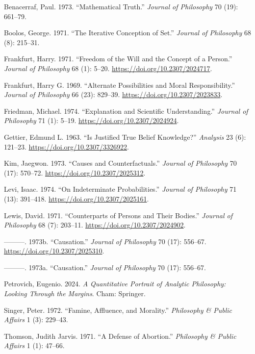 \documentclass[
  12pt,
  letterpaper,
  DIV=11,
  numbers=noendperiod]{scrartcl}
\newlength{\cslhangindent}
\newenvironment{CSLReferences}[2] %
 {\begin{list}{}{%
  \setlength{\itemindent}{0pt}
  \setlength{\leftmargin}{0pt}
  \setlength{\parsep}{0pt}
  \ifodd #1
   \setlength{\leftmargin}{\cslhangindent}
   \setlength{\itemindent}{-1\cslhangindent}
  \fi
  \setlength{\itemsep}{#2\baselineskip}}}
 {\end{list}}
\begin{document}
\label{refs}
\begin{CSLReferences}{1}{0}
Benacerraf, Paul. 1973. {``Mathematical Truth.''} \emph{Journal of
Philosophy} 70 (19): 661--79.

Boolos, George. 1971. {``The Iterative Conception of Set.''}
\emph{Journal of Philosophy} 68 (8): 215--31.

Frankfurt, Harry. 1971. {``Freedom of the Will and the Concept of a
Person.''} \emph{Journal of Philosophy} 68 (1): 5--20.
\url{https://doi.org/10.2307/2024717}.

Frankfurt, Harry G. 1969. {``Alternate Possibilities and Moral
Responsibility.''} \emph{Journal of Philosophy} 66 (23): 829--39.
\url{https://doi.org/10.2307/2023833}.

Friedman, Michael. 1974. {``Explanation and Scientific Understanding.''}
\emph{Journal of Philosophy} 71 (1): 5--19.
\url{https://doi.org/10.2307/2024924}.

Gettier, Edmund L. 1963. {``Is Justified True Belief Knowledge?''}
\emph{Analysis} 23 (6): 121--23. \url{https://doi.org/10.2307/3326922}.

Kim, Jaegwon. 1973. {``Causes and Counterfactuals.''} \emph{Journal of
Philosophy} 70 (17): 570--72. \url{https://doi.org/10.2307/2025312}.

Levi, Isaac. 1974. {``On Indeterminate Probabilities.''} \emph{Journal
of Philosophy} 71 (13): 391--418. \url{https://doi.org/10.2307/2025161}.

Lewis, David. 1971. {``Counterparts of Persons and Their Bodies.''}
\emph{Journal of Philosophy} 68 (7): 203--11.
\url{https://doi.org/10.2307/2024902}.

---------. 1973b. {``Causation.''} \emph{Journal of Philosophy} 70 (17):
556--67. \url{https://doi.org/10.2307/2025310}.

---------. 1973a. {``Causation.''} \emph{Journal of Philosophy} 70 (17):
556--67.

Petrovich, Eugenio. 2024. \emph{A Quantitative Portrait of Analytic
Philosophy: Looking Through the Margins}. Cham: Springer.

Singer, Peter. 1972. {``Famine, Affluence, and Morality.''}
\emph{Philosophy \& Public Affairs} 1 (3): 229--43.

Thomson, Judith Jarvis. 1971. {``A Defense of Abortion.''}
\emph{Philosophy \& Public Affairs} 1 (1): 47--66.

\end{CSLReferences}
\end{document}
